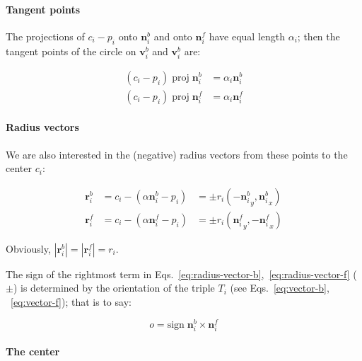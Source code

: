 \documentclass{article}
\begin{document}
\paragraph{Tangent points}

The projections of $c_{i}-p_{i}$ onto $\mathbf{n}^{b}_{i}$ and onto $\mathbf{n}^{f}_{i}$ have equal length $\alpha_i$; then the tangent points of the circle on $\mathbf{v}^{b}_{i}$ and $\mathbf{v}^{b}_{i}$ are:

\begin{align}
  \label{eq:alpha-vector-b}
  \left(c_{i}-p_{i}\right)\;\mathrm{proj}\; \mathbf{n}^{b}_{i} &= \alpha_i\mathbf{n}^{b}_{i}\\
  \label{eq:alpha-vector-f}
  \left(c_{i}-p_{i}\right)\;\mathrm{proj}\; \mathbf{n}^{f}_{i} &= \alpha_i\mathbf{n}^{f}_{i}
\end{align}

\paragraph{Radius vectors}

We are also interested in the (negative) radius vectors from these points to the center $c_{i}$:

\begin{align}
  \label{eq:radius-vector-b}
  \mathbf{r}^{b}_{i} &= c_{i} - \left(\alpha\mathbf{n}^{b}_{i} - p_{i}\right)&=\pm r_i\left( -{\mathbf{n}^{b}_{i}}_{y},  {\mathbf{n}^{b}_{i}}_{x} \right)\\
  \label{eq:radius-vector-f}
  \mathbf{r}^{f}_{i} &= c_{i} - \left(\alpha\mathbf{n}^{f}_{i} - p_{i}\right)&=\pm r_i\left(  {\mathbf{n}^{f}_{i}}_{y}, -{\mathbf{n}^{f}_{i}}_{x} \right)
\end{align}

Obviously, $\left|\mathbf{r}^{b}_{i}\right| = \left|\mathbf{r}^{f}_{i}\right| = r_{i}$.

The sign of the rightmost term in Eqs.~\eqref{eq:radius-vector-b},~\eqref{eq:radius-vector-f} ($\pm$) is determined by the orientation of the triple $T_i$ (see Eqs.~\eqref{eq:vector-b}, ~\eqref{eq:vector-f}); that is to say:

\begin{equation}
  \label{eq:orientation}
  o = \mathrm{sign}\; \mathbf{n}^{b}_{i} \times \mathbf{n}^{f}_{i}
\end{equation}

\paragraph{The center}
\end{document}
